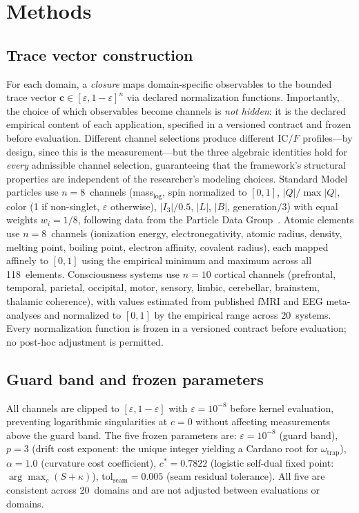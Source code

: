 \documentclass[11pt]{article}
\newcommand{\eps}{\varepsilon}
\newcommand{\IC}{\mathrm{IC}}
\newcommand{\tvec}{\mathbf{c}}
\begin{document}
\section{Methods}

\subsection{Trace vector construction}

For each domain, a \emph{closure} maps domain-specific observables to
the bounded trace vector $\tvec \in [\eps, 1{-}\eps]^n$ via declared
normalization functions. Importantly, the choice of which
observables become channels is \emph{not hidden}: it is the declared
empirical content of each application, specified in a versioned
contract and frozen before evaluation. Different channel selections
produce different $\IC/F$ profiles---by design, since this is the
measurement---but the three algebraic identities hold for
\emph{every} admissible channel selection, guaranteeing that the
framework's structural properties are independent of the
researcher's modeling choices. Standard Model particles use $n = 8$~channels
(mass$_{\log}$, spin normalized to $[0,1]$,
$|Q|/\max|Q|$, color (1 if non-singlet, $\eps$ otherwise),
$|I_3|/0.5$, $|L|$, $|B|$, generation$/3$) with equal weights
$w_i = 1/8$, following data from the Particle Data
Group~\cite{pdg2024}. Atomic elements use $n = 8$~channels
(ionization energy, electronegativity, atomic radius, density,
melting point, boiling point, electron affinity, covalent radius),
each mapped affinely to $[0, 1]$ using the empirical minimum and
maximum across all 118~elements. Consciousness systems use $n = 10$
cortical channels (prefrontal, temporal, parietal, occipital, motor,
sensory, limbic, cerebellar, brainstem, thalamic coherence),
with values estimated from published fMRI and EEG meta-analyses and
normalized to $[0, 1]$ by the empirical range across 20~systems.
Every normalization function is
frozen in a versioned contract before evaluation; no post-hoc
adjustment is permitted.

\subsection{Guard band and frozen parameters}

All channels are clipped to $[\eps, 1{-}\eps]$ with
$\eps = 10^{-8}$ before kernel evaluation, preventing logarithmic
singularities at $c = 0$ without affecting measurements above the
guard band. The five frozen parameters are:
$\eps = 10^{-8}$ (guard band),
$p = 3$ (drift cost exponent: the unique integer yielding a Cardano
root for $\omega_{\mathrm{trap}}$),
$\alpha = 1.0$ (curvature cost coefficient),
$c^* = 0.7822$ (logistic self-dual fixed point: $\arg\max_c (S + \kappa)$),
$\mathrm{tol}_{\mathrm{seam}} = 0.005$ (seam residual tolerance).
All five are consistent across 20~domains and are not adjusted between
evaluations or domains.
\end{document}
